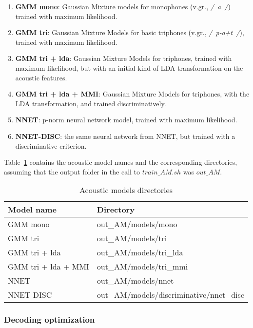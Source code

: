 \documentclass[11pt,a4paper,titlepage,twoside]{article}
\begin{document}
\begin{enumerate}
\item \textbf{GMM mono}: Gaussian Mixture models for monophones (v.gr., \textit{/~a~/}) trained with maximum likelihood.
\item \textbf{GMM tri}: Gaussian Mixture Models for basic triphones (v.gr., \textit{/~p-a+t~/}), trained with maximum likelihood.
\item \textbf{GMM tri + lda}: Gaussian Mixture Models for triphones, trained with maximum likelihood, but with an initial kind of LDA transformation on the acoustic features.
\item \textbf{GMM tri + lda + MMI}: Gaussian Mixture Models for triphones, with the LDA transformation, and trained discriminatively.
\item \textbf{NNET}: p-norm neural network model, trained with maximum likelihood.
\item \textbf{NNET-DISC}: the same neural network from NNET, but trained with a discriminative criterion.
\end{enumerate}

Table~\ref{tab:model-directories} contains the acoustic model names and the corresponding directories, assuming that the output folder in the call to $train\_AM.sh$ was $out\_AM$.

\begin{table}[htb!]
  \scriptsize
  \centering
  \begin{tabular}{|l|l|}
    \hline
    \textbf{Model name} & \textbf{Directory} \\ \hline \hline
    GMM mono & out\_AM/models/mono \\ \hline
    GMM tri & out\_AM/models/tri \\ \hline
    GMM tri + lda & out\_AM/models/tri\_lda \\ \hline
    GMM tri + lda + MMI & out\_AM/models/tri\_mmi \\ \hline
    NNET & out\_AM/models/nnet \\ \hline
    NNET DISC & out\_AM/models/discriminative/nnet\_disc \\ \hline
  \end{tabular}
  \caption{Acoustic models directories}
  \label{tab:model-directories}
\end{table}

\subsubsection{Decoding optimization}
\label{sec:decoding-optimization}
\end{document}
